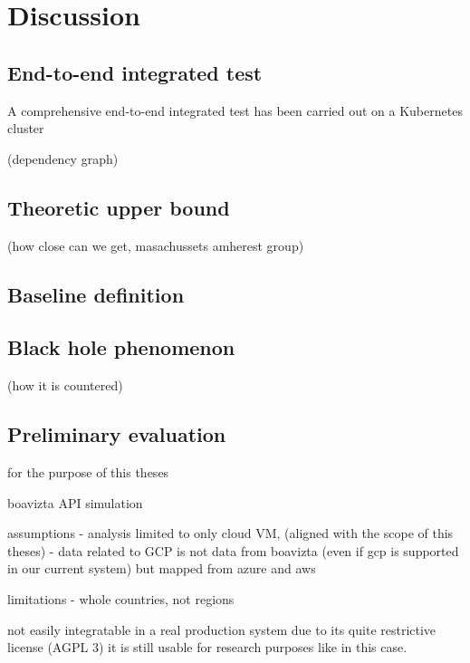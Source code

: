 \chapter{Discussion}
\label{cha:discussion}

\section{End-to-end integrated test}

A comprehensive end-to-end integrated test has been carried out on a Kubernetes cluster

(dependency graph)



\section{Theoretic upper bound}

 (how close can we get, masachussets amherest group)



\section{Baseline definition}

\section{Black hole phenomenon}

(how it is countered)

\section{Preliminary evaluation}

for the purpose of this theses

boavizta API simulation

assumptions
- analysis limited to only cloud VM, (aligned with the scope of this theses)
- data related to GCP is not data from boavizta (even if gcp is supported in our current system) but mapped from azure and aws

limitations
- whole countries, not regions


not easily integratable in a real production system due to its quite restrictive license (AGPL 3)
it is still usable for research purposes like in this case.







\newpage

